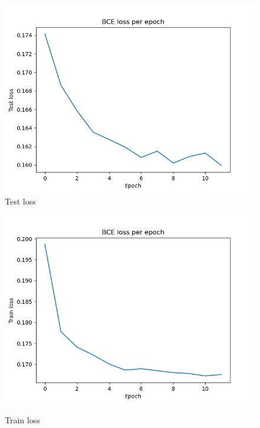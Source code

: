 \documentclass[12pt, letterpaper, twoside]{article}
\begin{document}
\begin{figure}[ht]
\begin{minipage}[b]{0.5\linewidth}
  \end{minipage} 
  \begin{minipage}[b]{0.5\linewidth}
    \centering
    \includegraphics[scale=0.5]{"Task4_testlosses.png"}\\ 
    \caption{Test loss} 
    \vspace{4ex}
  \end{minipage}%
  \begin{minipage}[b]{0.5\linewidth}
    \centering
    \includegraphics[scale=0.5]{"Task4_trainlosses.png"}\\
    \caption{Train loss} 
    \vspace{4ex}
  \end{minipage} 
\end{figure}
\end{document}
